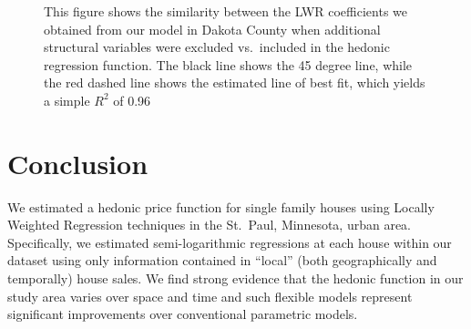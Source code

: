 \documentclass{article}\usepackage{graphicx, color}
\begin{document}
\begin{figure}
\caption{This figure shows the similarity between the LWR coefficients we obtained from our model in Dakota County when additional structural variables were excluded vs.\ included in the hedonic regression function. The black line shows the 45 degree line, while the red dashed line shows the estimated line of best fit, which yields a simple $R^2$ of 0.96}\label{fig:DAK}
\end{figure}

\section{Conclusion}
We estimated a hedonic price function for single family houses using Locally Weighted Regression techniques in the St.\ Paul, Minnesota, urban area. Specifically, we estimated semi-logarithmic regressions at each house within our dataset using only information contained in ``local'' (both geographically and temporally) house sales. We find strong evidence that the hedonic function in our study area varies over space and time and such flexible models represent significant improvements over conventional parametric models. 
\end{document}
